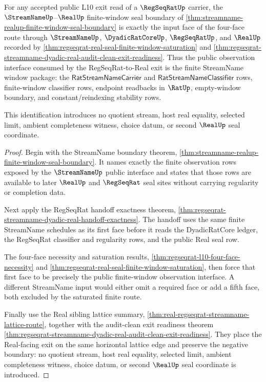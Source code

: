 \begin{theorem}
\label{thm:streamname-regseqrat-real-observation-interface}
For any accepted public L10 exit read of a $\RegSeqRatUp$ carrier, the
$\StreamNameUp$--$\RealUp$ finite-window seal boundary of
\autoref{thm:streamname-realup-finite-window-seal-boundary} is exactly the
input face of the four-face route through $\StreamNameUp$, $\DyadicRatCoreUp$,
$\RegSeqRatUp$, and $\RealUp$ recorded by
\autoref{thm:regseqrat-real-seal-finite-window-saturation} and
\autoref{thm:regseqrat-streamname-dyadic-real-audit-clean-exit-readiness}.
Thus the public observation interface consumed by the RegSeqRat-to-Real exit is
the finite StreamName window package: the $\mathsf{RatStreamNameCarrier}$ and
$\mathsf{RatStreamNameClassifier}$ rows, finite-window classifier rows,
endpoint readbacks in $\RatUp$, empty-window boundary, and constant/reindexing
stability rows.

This identification introduces no quotient stream, host real equality, selected
limit, ambient completeness witness, choice datum, or second $\RealUp$ seal
coordinate.
\end{theorem}
\begin{proof}
Begin with the StreamName boundary theorem,
\autoref{thm:streamname-realup-finite-window-seal-boundary}. It names exactly
the finite observation rows exposed by the $\StreamNameUp$ public interface and
states that those rows are available to later $\RealUp$ and $\RegSeqRat$ seal
sites without carrying regularity or completion data.

Next apply the RegSeqRat handoff exactness theorem,
\autoref{thm:regseqrat-streamname-dyadic-real-handoff-exactness}. The handoff
uses the same finite StreamName schedules as its first face before it reads the
DyadicRatCore ledger, the RegSeqRat classifier and regularity rows, and the
public Real seal row.

The four-face necessity and saturation results,
\autoref{thm:regseqrat-l10-four-face-necessity} and
\autoref{thm:regseqrat-real-seal-finite-window-saturation}, then force that
first face to be precisely the public finite-window observation interface. A
different StreamName input would either omit a required face or add a fifth
face, both excluded by the saturated finite route.

Finally use the Real sibling lattice summary,
\autoref{thm:real-regseqrat-streamname-lattice-route}, together with the
audit-clean exit readiness theorem
\autoref{thm:regseqrat-streamname-dyadic-real-audit-clean-exit-readiness}. They
place the Real-facing exit on the same horizontal lattice edge and preserve the
negative boundary: no quotient stream, host real equality, selected limit,
ambient completeness witness, choice datum, or second $\RealUp$ seal coordinate
is introduced.
\end{proof}

